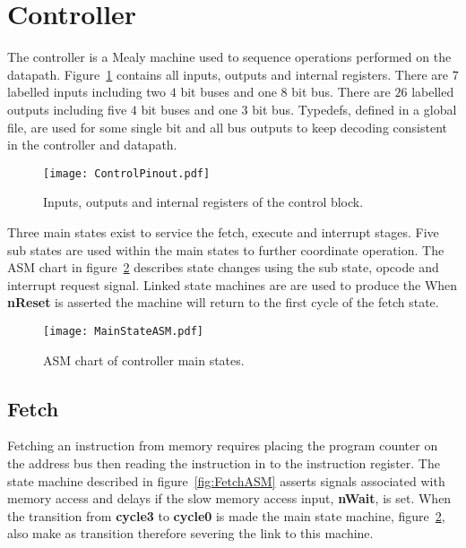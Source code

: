 \section{Controller}

The controller is a Mealy machine used to sequence operations performed on the datapath.
Figure~\ref{fig:ControlBlock} contains all inputs, outputs and internal registers.
There are $7$ labelled inputs including two $4$ bit buses and one $8$ bit bus.
There are $26$ labelled outputs including five $4$ bit buses and one $3$ bit bus.
Typedefs, defined in a global file, are used for some single bit and all bus outputs to keep decoding consistent in the controller and datapath. 


\begin{figure}[ht]
   \centering
    \texttt{[image: ControlPinout.pdf]}
		\caption{Inputs, outputs and internal registers of the control block.}%
   \label{fig:ControlBlock}
\end{figure}

Three main states exist to service the fetch, execute and interrupt stages.
Five sub states are used within the main states to further coordinate operation.
The ASM chart in figure~\ref{fig:MainStateASM} describes state changes using the sub state, opcode and interrupt request signal.   
Linked state machines are are used to produce the 
When \textbf{nReset} is asserted the machine will return to the first cycle of the fetch state.



\begin{figure}[ht]
   \centering
    \texttt{[image: MainStateASM.pdf]}
		\caption{ASM chart of controller main states.}
		\label{fig:MainStateASM}
\end{figure}








\subsection{Fetch}

Fetching an instruction from memory requires placing the program counter on the address bus then reading the instruction in to the instruction register. 
The state machine described in figure~\ref{fig:FetchASM} asserts signals associated with memory access and delays if the slow memory access input, \textbf{nWait}, is set.
When the transition from \textbf{cycle3} to \textbf{cycle0} is made the main state machine, figure~\ref{fig:MainStateASM}, also make as transition therefore severing the link to this machine. 

